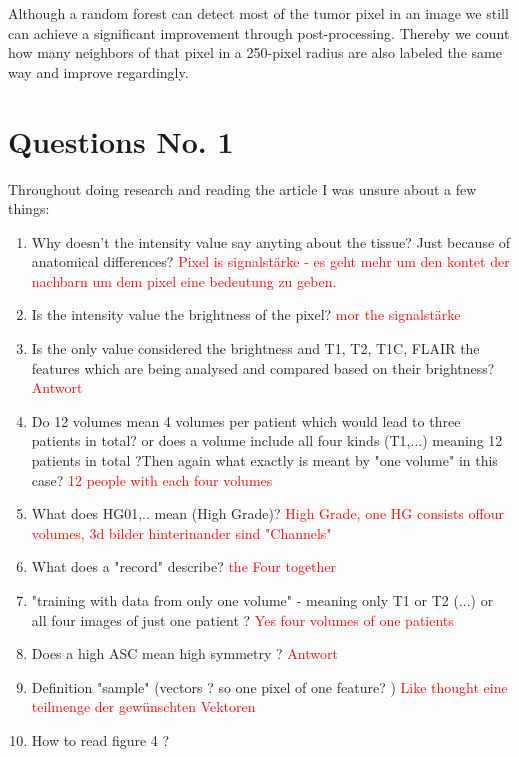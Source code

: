 \documentclass{article}
\begin{document}
 Although a random forest can detect most of the tumor pixel in an image we still can achieve a significant improvement through post-processing. Thereby we count how many neighbors of that pixel in a 250-pixel radius are also labeled the same way and improve regardingly. \\
 

 \newpage
 \section{Questions No. 1}
 Throughout doing research and reading the article I was unsure about a few things:

 \begin{enumerate}
     \item Why doesn't the intensity value say anyting about the tissue? Just because of anatomical differences? 
        \textcolor{red}{Pixel is signalstärke - es geht mehr um den kontet der nachbarn um dem pixel eine bedeutung zu geben.}
     \item Is the intensity value the brightness of the pixel? 
        \textcolor{red}{mor the signalstärke}
     \item Is the only value considered the brightness and T1, T2, T1C, FLAIR the features which are being analysed and compared based on their brightness? 
        \textcolor{red}{Antwort}
     \item Do 12 volumes mean 4 volumes per patient which would lead to three patients in total? or does a volume include all four kinds (T1,...) meaning 12 patients in total ?Then again what exactly is meant by "one volume" in this case? 
        \textcolor{red}{12 people with each four volumes}
     \item What does HG01,.. mean (High Grade)? 
        \textcolor{red}{High Grade, one HG consists offour volumes, 3d bilder hinterinander sind "Channels"}
     \item What does a "record" describe? 
        \textcolor{red}{the Four together }
     \item "training with data from only one volume" - meaning only T1 or T2 (...) or all four images of just one patient ? 
        \textcolor{red}{Yes four volumes of one patients}
     \item Does a high ASC mean high symmetry ?
        \textcolor{red}{Antwort}
     \item Definition "sample" (vectors ? so one pixel of one feature? )
        \textcolor{red}{Like thought eine teilmenge der gewünschten Vektoren}
     \item How to read figure 4 ? 

\end{enumerate}
\end{document}
